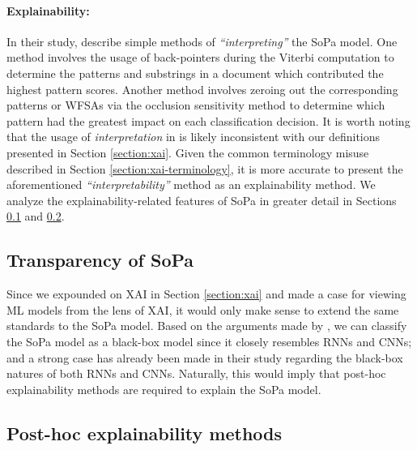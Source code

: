 \paragraph{Explainability:} In their study, \citet[Page 7, Section 7]{schwartz2018sopa} describe simple methods of \textit{``interpreting''} the SoPa model. One method involves the usage of back-pointers during the Viterbi computation to determine the patterns and substrings in a document which contributed the highest pattern scores. Another method involves zeroing out the corresponding patterns or WFSAs via the occlusion sensitivity method to determine which pattern had the greatest impact on each classification decision. It is worth noting that the usage of \textit{interpretation} in \citet{schwartz2018sopa} is likely inconsistent with our definitions presented in Section \ref{section:xai}. Given the common terminology misuse described in Section \ref{section:xai-terminology}, it is more accurate to present the aforementioned \textit{``interpretability''} method as an explainability method. We analyze the explainability-related features of SoPa in greater detail in Sections \ref{section:sopa-transparency} and \ref{section:sopa-explainability}. 

\subsection{Transparency of SoPa}

\label{section:sopa-transparency}

Since we expounded on XAI in Section \ref{section:xai} and made a case for viewing ML models from the lens of XAI, it would only make sense to extend the same standards to the SoPa model. Based on the arguments made by \citet{arrieta2020explainable}, we can classify the SoPa model as a black-box model since it closely resembles RNNs and CNNs; and a strong case has already been made in their study regarding the black-box natures of both RNNs and CNNs. Naturally, this would imply that post-hoc explainability methods are required to explain the SoPa model. 

\subsection{Post-hoc explainability methods}

\label{section:sopa-explainability}

